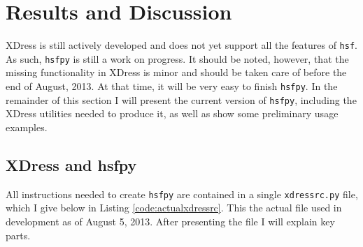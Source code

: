 
\section{Results and Discussion} \label{sec:results_and_discussion}

XDress is still actively developed and does not yet support all the features of \texttt{hsf}. As such, \texttt{hsfpy} is still a work on progress. It should be noted, however, that the missing functionality in XDress is minor and should be taken care of before the end of August, 2013. At that time, it will be very easy to finish \texttt{hsfpy}. In the remainder of this section I will present the current version of \texttt{hsfpy}, including the XDress utilities needed to produce it, as well as show some preliminary usage examples.

\subsection{XDress and hsfpy} \label{sub:xdress_and_hsfpy}

  All instructions needed to create \texttt{hsfpy} are contained in a single \texttt{xdressrc.py} file, which I give below in Listing \ref{code:actualxdressrc}. This the actual file used in development as of August 5, 2013. After presenting the file I will explain key parts.

  \vspace{.2in}
  

